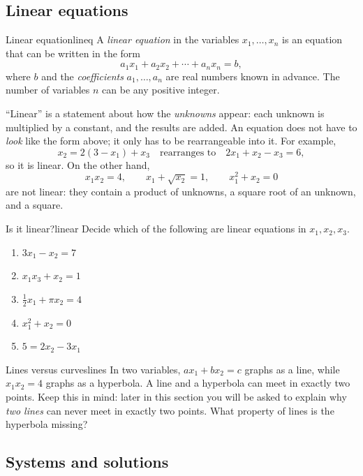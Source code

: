 \documentclass[11pt]{article}
\begin{document}
\subsection*{Linear equations}
 
\begin{defn}{Linear equation}{lineq}
A \emph{linear equation} in the variables $x_1,\dots,x_n$ is an equation that can be written in
the form
\[
a_1x_1+a_2x_2+\cdots+a_nx_n=b,
\]
where $b$ and the \emph{coefficients} $a_1,\dots,a_n$ are real numbers known in advance.
The number of variables $n$ can be any positive integer.
\end{defn}
 
``Linear'' is a statement about how the \emph{unknowns} appear: each unknown is multiplied by a
constant, and the results are added. An equation does not have to \emph{look} like the
form above; it only has to be rearrangeable into it. For example,
\[
x_2 = 2(3-x_1)+x_3 \quad\text{rearranges to}\quad 2x_1+x_2-x_3=6,
\]
so it is linear. On the other hand,
\[
x_1x_2=4,\qquad x_1+\sqrt{x_2}=1,\qquad x_1^2+x_2=0
\]
are not linear: they contain a product of unknowns, a square root of an unknown, and a square.
 
\begin{kc}{Is it linear?}{linear}
Decide which of the following are linear equations in $x_1,x_2,x_3$.
\begin{enumerate}[label=(\alph*)]
  \item $3x_1-x_2=7$
  \item $x_1x_3+x_2=1$
  \item $\tfrac12 x_1+\pi x_2=4$
  \item $x_1^2+x_2=0$
  \item $5=2x_2-3x_1$
\end{enumerate}
\end{kc}
 
\begin{think}{Lines versus curves}{lines}
In two variables, $ax_1+bx_2=c$ graphs as a line, while $x_1x_2=4$ graphs as a hyperbola.
A line and a hyperbola can meet in exactly two points. Keep this in mind: later in this
section you will be asked to explain why \emph{two lines} can never meet in exactly two points.
What property of lines is the hyperbola missing?
\end{think}
 
\subsection*{Systems and solutions}
 
\end{document}
